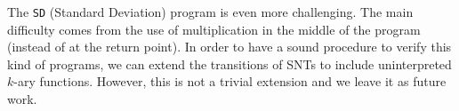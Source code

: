 






The \texttt{SD} (Standard Deviation) program is even more challenging. The main difficulty comes from the use of multiplication in the middle of the program (instead of at the return point). In order to have a sound procedure to verify this kind of programs, we can extend the transitions of SNTs to include uninterpreted $k$-ary functions. However, this is not a trivial extension and we leave it as future work.


